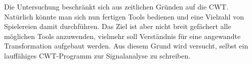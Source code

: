 Die Untersuchung beschränkt sich aus zeitlichen Gründen auf die CWT. Natürlich könnte man sich nun fertigen Tools bedienen und eine Vielzahl von Spielereien damit durchführen. Das Ziel ist aber nicht breit gefächert alle möglichen Tools anzuwenden, vielmehr soll Verständnis für eine angewandte Transformation aufgebaut werden. Aus diesem Grund wird versucht, selbst ein lauffähiges CWT-Programm zur Signalanalyse zu schreiben. 
